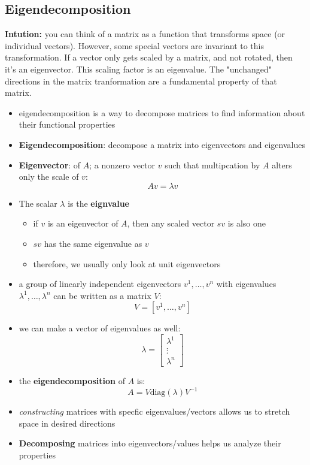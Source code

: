\subsection{Eigendecomposition}
\textbf{Intution:} you can think of a matrix as a function that transforms space (or individual vectors). However, some special vectors are invariant to this transformation. If a vector only gets scaled by a matrix, and not rotated, then it's an eigenvector. This scaling factor is an eigenvalue. The "unchanged" directions in the matrix tranformation are a fundamental property of that matrix.
\begin{itemize}
    \item eigendecomposition is a way to decompose matrices to find information about their functional properties
    \item \textbf{Eigendecomposition}: decompose a matrix into eigenvectors and eigenvalues
    \item \textbf{Eigenvector}: of $A$; a nonzero vector $v$ such that multipcation by $A$ alters only the scale of $v$:
    $$ A v = \lambda v$$
    \item The scalar $\lambda$ is the \textbf{eignvalue}
    \begin{itemize}
        \item if $v$ is an eigenvector of $A$, then any scaled vector $sv$ is also one
        \item $sv$ has the same eigenvalue as $v$
        \item therefore, we usually only look at unit eigenvectors
    \end{itemize}
    \item a group of linearly independent eigenvectors ${v^1, \dots, v^n}$ with eigenvalues ${\lambda^1, \dots, \lambda^n}$ can be written as a matrix $V$:
    $$ V = [v^1, \dots, v^n]$$
    \item we can make a vector of eigenvalues as well:
    $$ \lambda = \begin{bmatrix}
        \lambda^1 \\
        \vdots \\
        \lambda^n 
    \end{bmatrix}$$
    \item the \textbf{eigendecomposition} of $A$ is:
    $$ A = V \text{diag}(\lambda)V^{-1}$$
    \item \textit{constructing} matrices with specfic eigenvalues/vectors allows us to stretch space in desired directions
    \item \textbf{Decomposing} matrices into eigenvectors/values helps us analyze their properties

\end{itemize}
